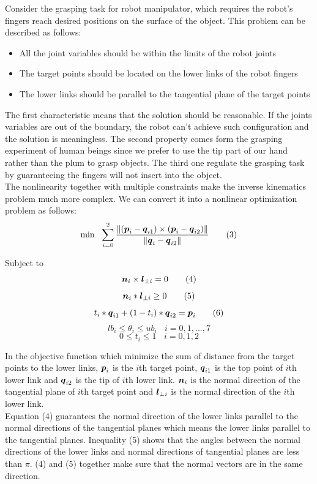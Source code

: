 \documentclass[journal,comsoc]{IEEEtran}
\begin{document}
Consider the grasping task for robot manipulator, which requires the robot's fingers reach desired positions on the surface of the object. This problem can be described as follows:
\begin{itemize} 
\item All the joint variables should be within the limits of the robot joints
\item The target points should be located on the lower links of the robot fingers
\item The lower links should be parallel to the tangential plane of the target points
\end{itemize} 

The first characteristic means that the solution should be reasonable. If the joints variables are out of the boundary, the robot can't achieve such configuration and the solution is meaningless. The second property comes form the grasping experiment of human beings since we prefer to use the tip part of our hand rather than the plum to grasp objects. The third one regulate the grasping task by guaranteeing the fingers will not insert into the object. \\

The nonlinearity  together with multiple constraints make the inverse kinematics problem much more complex. We can convert it into a nonlinear optimization problem as follows: 
\[
\min \ \  \sum_{i=0}^{2} \frac{\|(\pb_i-\qb_{i1})\times (\pb_i-\qb_{i2}) \|}{\|\qb_i-\qb_{i2}\|}   \tag{3}
\]

Subject to 
\[
\mbox{\boldmath $n$}_i \times \mbox{\boldmath $l$}_{\perp i} =0 \tag{4}
\]
\[
\mbox{\boldmath $n$}_i * \mbox{\boldmath $l$}_{\perp i} \geq 0    \tag{5}
\]
\[
 t_i* \mbox{\boldmath $q$}_{i1} +(1-t_i) * \mbox{\boldmath $q$}_{i2} = \mbox{\boldmath $p$}_i  \tag{6}
\]
\[
lb_i \leq \theta_i \leq ub_i  \ \ \ \     i=0, 1, ..., 7  \tag{7}
\]
\[
0 \leq t_i  \leq 1    \ \ \ \     i=0, 1, 2   \tag{8}
\]

In the objective function which minimize the sum of distance from the target points to the lower links, $\mbox{\boldmath $p$}_i$ is the $i$th target point, $\mbox{\boldmath $q$}_{i1}$ is the top point of $i$th lower link and $\mbox{\boldmath $q$}_{i2}$  is the tip of $i$th lower link. $\mbox{\boldmath $n$}_i$ is the normal direction of the tangential plane of $i$th target point and $\mbox{\boldmath $l$}_{\perp i}$ is the normal direction of the $i$th lower link.\\ Equation (4) guarantees the normal direction of the lower links parallel to the normal directions of the tangential planes which means the lower links parallel to the tangential planes. Inequality (5) shows that the angles between the normal directions of the lower links and  normal directions of tangential planes  are less than $\pi$. (4) and (5) together make sure that the normal vectors are in the same direction. \\
\end{document}
